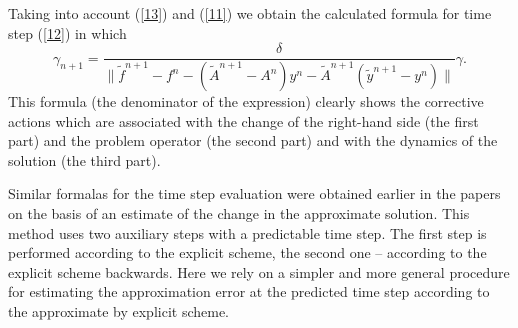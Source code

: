 \documentclass{aip-cp}
\begin{document}
Taking into account (\ref{13}) and (\ref{11}) we obtain the calculated formula for time step (\ref{12}) in which
\begin{equation}\label{14}
  \gamma_{n+1} = \frac{\delta}{ \|\widetilde{f}^{n+1} - f^n  -
  (\widetilde{A}^{n+1} - A^n) y^n  -
  \widetilde{A}^{n+1} (\widetilde{y}^{n+1} - y^n) \| } \gamma .
\end{equation} 
This formula (the denominator of the expression) clearly shows the corrective actions which are associated with the change of the right-hand side (the first part) and the problem operator (the second part) and with the dynamics of the solution (the third part).

Similar formalas for the time step evaluation were obtained earlier in the papers \cite{vabishchevich2015priori, vabishchevich2015time} on the basis of an estimate of the change in the approximate solution. This method uses  two auxiliary steps with a predictable time step.
The first step is performed according to the explicit scheme, the second one -- according to the explicit scheme backwards.
Here we rely on a simpler and more general procedure for estimating the approximation error at the predicted time step according to the approximate by explicit scheme.
\end{document}
